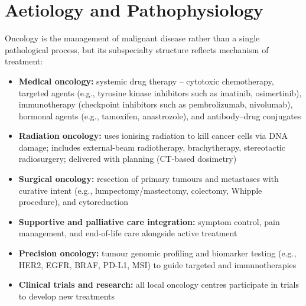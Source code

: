 \section*{Aetiology and Pathophysiology}
Oncology is the management of malignant disease rather than a single pathological process, but its subspecialty structure reflects mechanism of treatment:
\begin{itemize}
    \item \textbf{Medical oncology:} systemic drug therapy -- cytotoxic chemotherapy, targeted agents (e.g., tyrosine kinase inhibitors such as imatinib, osimertinib), immunotherapy (checkpoint inhibitors such as pembrolizumab, nivolumab), hormonal agents (e.g., tamoxifen, anastrozole), and antibody--drug conjugates
    \item \textbf{Radiation oncology:} uses ionising radiation to kill cancer cells via DNA damage; includes external-beam radiotherapy, brachytherapy, stereotactic radiosurgery; delivered with planning (CT-based dosimetry)
    \item \textbf{Surgical oncology:} resection of primary tumours and metastases with curative intent (e.g., lumpectomy/mastectomy, colectomy, Whipple procedure), and cytoreduction
    \item \textbf{Supportive and palliative care integration:} symptom control, pain management, and end-of-life care alongside active treatment
    \item \textbf{Precision oncology:} tumour genomic profiling and biomarker testing (e.g., HER2, EGFR, BRAF, PD-L1, MSI) to guide targeted and immunotherapies
    \item \textbf{Clinical trials and research:} all local oncology centres participate in trials to develop new treatments
\end{itemize}

